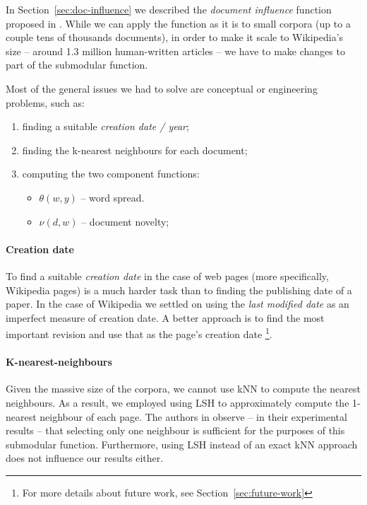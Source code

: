 In Section~\vref{sec:doc-influence} we described the \emph{document influence}
function proposed in \cite{sipos2012temporal}.
While we can apply the function as it is to small corpora (up to a couple tens
of thousands documents), in order to make it scale to Wikipedia's size --
around 1.3 million human-written articles -- we have to make changes to part of
the submodular function.

Most of the general issues we had to solve are conceptual or engineering
problems, such as:
\begin{enumerate}
  \item finding a suitable \emph{creation date / year};
  \item finding the k-nearest neighbours for each document;
  \item computing the two component functions:
  \begin{itemize}
    \item \(\theta(w, y)\) -- word spread.
    \item \(\nu(d, w)\) -- document novelty;
  \end{itemize}
\end{enumerate}

\paragraph{Creation date}
To find a suitable \emph{creation date} in the case of web pages (more
specifically, Wikipedia pages) is a much harder task than to finding the
publishing date of a paper.
In the case of Wikipedia we settled on using the \emph{last modified date} as
an imperfect measure of creation date. A better approach is to find the most
important revision and use that as the page's creation date \footnote{For more
details about future work, see Section~\vref{sec:future-work}}.

\paragraph{K-nearest-neighbours}
Given the massive size of the corpora, we cannot use \ac{kNN} to compute the
nearest neighbours. As a result, we employed using \ac{LSH} to approximately
compute the 1-nearest neighbour of each page. The authors in
\cite{sipos2012temporal} observe -- in their experimental results -- that
selecting only one neighbour is sufficient for the purposes of this submodular
function. Furthermore, using \ac{LSH} instead of an exact \ac{kNN} approach
does not influence our results either.

